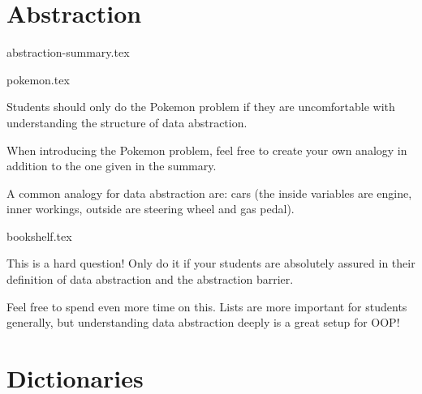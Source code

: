 \documentclass{exam}
\begin{document}
\section{Abstraction}
{abstraction-summary.tex}
\begin{questions}
    {pokemon.tex}
    \begin{questionmeta}
        Students should only do the Pokemon problem if they are uncomfortable with understanding the structure of data abstraction.
    \end{questionmeta}
    \begin{questionmeta}
        When introducing the Pokemon problem, feel free to create your own analogy in addition to the one given in the summary.
    \end{questionmeta}
    \begin{questionmeta}
        A common analogy for data abstraction are: cars (the inside variables are engine, inner workings, outside are steering wheel and gas pedal).
    \end{questionmeta}
    {bookshelf.tex}
    \begin{questionmeta}
        This is a hard question! Only do it if your students are absolutely assured in their definition of data abstraction and the abstraction barrier.
    \end{questionmeta}
    \begin{questionmeta}
        Feel free to spend even more time on this. Lists are more important for students generally, but understanding data abstraction deeply is a great setup for OOP!
    \end{questionmeta}
\end{questions}

\section{Dictionaries}
\end{document}
